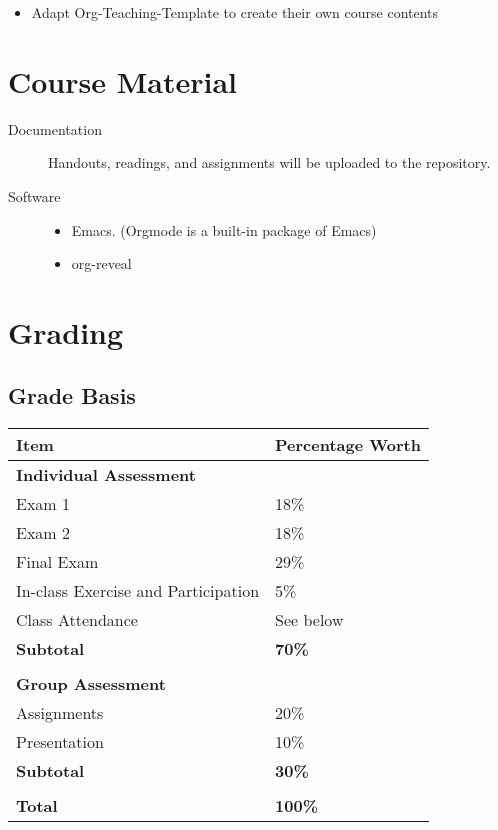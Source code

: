\documentclass[article,letterpaper,times,10pt,listings-bw,microtype]{scrartcl}
\begin{document}
\begin{itemize}
\item Adapt Org-Teaching-Template to create their own course contents
\end{itemize}
\section*{Course Material}
\label{sec:org4844ba4}
\begin{description}
\item[{Documentation}] Handouts, readings, and assignments will be uploaded to
the repository.
\item[{Software}] \quad 

\begin{itemize}
\item Emacs. (Orgmode is a built-in package of Emacs)
\item org-reveal
\end{itemize}
\end{description}
\section*{Grading}
\label{sec:org243d2a2}

\subsection*{Grade Basis}
\label{sec:org97d536f}
\begin{center}
\label{tab:orgb6b59c7}
\begin{tabular}{ll}
\hline
Item & Percentage Worth\\
\hline
\textbf{Individual Assessment} & \\
Exam 1 & 18\%\\
Exam 2 & 18\%\\
Final Exam & 29\%\\
In-class Exercise and Participation & 5\%\\
Class Attendance & See below\\
\textbf{Subtotal} & \textbf{70\%}\\
\hline
 & \\
\textbf{Group Assessment} & \\
Assignments & 20\%\\
Presentation & 10\%\\
\textbf{Subtotal} & \textbf{30\%}\\
\hline
 & \\
\textbf{Total} & \textbf{100\%}\\
\hline
\end{tabular}
\end{center}
\end{document}
